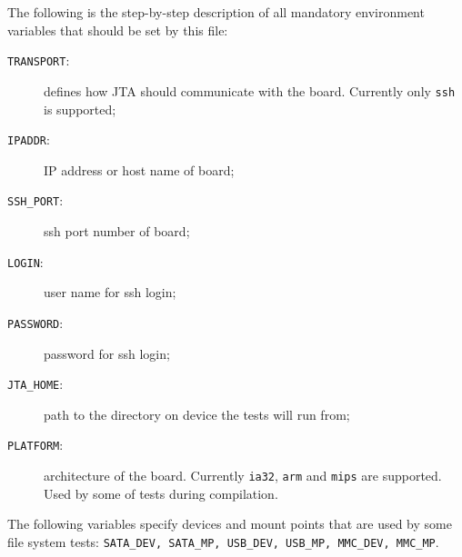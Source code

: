 The following is the step-by-step description of all mandatory environment variables that should be set by this file:

\begin{description}
\item[\texttt{TRANSPORT}:] defines how JTA should communicate with the board. 
  Currently only \texttt{ssh} is supported;
\item[\texttt{IPADDR}:]  IP address or host name of board;
\item[\texttt{SSH\_PORT}:]  ssh port number of board;
\item[\texttt{LOGIN}:]  user name for ssh login;
\item[\texttt{PASSWORD}:] password for ssh login;
\item[\texttt{JTA\_HOME}:] path to the directory on device the tests will run from;
\item[\texttt{PLATFORM}:] architecture of the board. 
  Currently \texttt{ia32}, \texttt{arm} and \texttt{mips} are supported. Used by some of tests during compilation.
\end{description}

The following variables specify devices and mount points that are used by some 
file system tests: \texttt{SATA\_DEV, SATA\_MP, USB\_DEV, USB\_MP, MMC\_DEV, MMC\_MP}.




